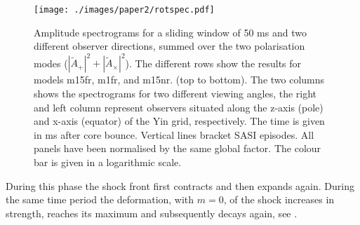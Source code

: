 \begin{figure}           
\centering                            
\texttt{[image: ./images/paper2/rotspec.pdf]}
\caption{Amplitude spectrograms for a sliding window of 50 ms and two different observer
  directions, summed over the two polarisation modes 
  ($|\widetilde{A}_+|^2 + |\widetilde{A}_\times|^2$). The
  different rows show the results for models m15fr, m1fr, and m15nr. (top to bottom).
  The two columns shows the spectrograms for two different viewing angles, the right and left column represent
  observers situated along the z-axis (pole) and x-axis (equator) of the Yin grid, respectively.
  The time is given in ms after core bounce. Vertical lines bracket SASI episodes. All panels have been normalised by the same global factor.
  The colour bar is given in a logarithmic scale. \label{figp2:spec}}
\end{figure}


During this phase the shock front first contracts and
then expands again. During the same time period the  deformation, with $m=0$, 
of the shock increases in strength, reaches its maximum and subsequently decays again, see .

